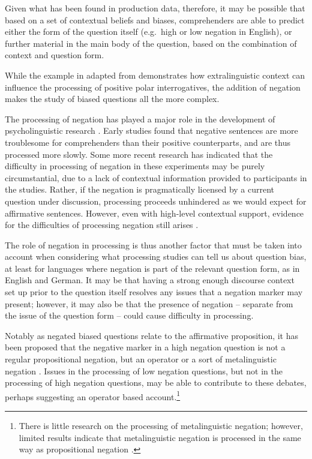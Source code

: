 \documentclass[output=paper,colorlinks,citecolor=brown]{langscibook}
\begin{document}
Given what has been found in production data, therefore, it may be possible that based on a set of contextual beliefs and biases, comprehenders are able to predict either the form of the question itself (e.g.\ high or low negation in English), or further material in the main body of the question, based on the combination of context and question form.

While the example in  adapted from \citet{Lemke2021} demonstrates how extralinguistic context can influence the processing of positive polar interrogatives, the addition of negation makes the study of biased questions all the more complex.

The processing of negation has played a major role in the development of psycholinguistic research \citep{Kaup2020}. Early studies \citep[e.g.][]{Just1971, fischler1983brain} found that negative sentences are more troublesome for comprehenders than their positive counterparts, and are thus processed more slowly. Some more recent research \citep{Nieuwland2008, Tian2010, Dale2011} has indicated that the difficulty in processing of negation in these experiments may be purely circumstantial, due to a lack of contextual information provided to participants in the studies. Rather, if the negation is pragmatically licensed by a current question under discussion, processing proceeds unhindered as we would expect for affirmative sentences. However, even with high-level contextual support, evidence for the difficulties of processing negation still arises \citep{Darley2020}.

The role of negation in processing is thus another factor that must be taken into account when considering what processing studies can tell us about question bias, at least for languages where negation is part of the relevant question form, as in English and German. It may be that having a strong enough discourse context set up prior to the question itself resolves any issues that a negation marker may present; however, it may also be that the presence of negation -- separate from the issue of the question form -- could cause difficulty in processing.

Notably as negated biased questions relate to the  affirmative proposition, it has been proposed that the negative marker in a high negation question is not a regular propositional negation, but an operator \citep{repp_negation_2009, romero_high_2015} or a sort of metalinguistic negation \citep{romero_negative_2004, krifka_bias_2015}. Issues in the processing of low negation questions, but not in the processing of high negation questions, may be able to contribute to these debates, perhaps suggesting an operator based account.\footnote{There is little research on the processing of metalinguistic negation; however, limited results indicate that metalinguistic negation is processed in the same way as propositional negation \citep{Noh2013, Blochowiak2018}.}
\end{document}
